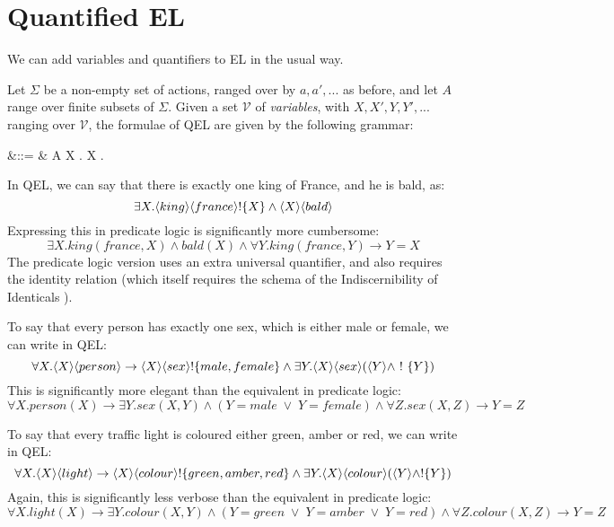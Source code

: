 \section{Quantified EL}

We can add variables and quantifiers to EL in the usual way.
\begin{definition} 
Let $\Sigma$ be a non-empty set of actions, ranged over by $a, a', ...$ as before, and let $A$ range over
finite subsets of $\Sigma$. 
Given a set $\mathcal{V}$ of \emph{variables},
with $X, X', Y, Y', ...$ ranging over $\mathcal{V}$, the formulae of QEL are given by the
following grammar:

\begin{GRAMMAR}
  \phi 
     &\quad ::= \quad & 
  \TRUE 
     \VERTICAL 
  \phi \AND \psi
     \VERTICAL 
     \VERTICAL 
     \VERTICAL 
  \fBang A 
     \VERTICAL 
  \exists X . {\phi}
     \VERTICAL 
  \forall X . {\phi}
\end{GRAMMAR}
\end{definition}
In QEL, we can say that there is exactly one king of France, and he is bald, as:
\[
\exists X . \langle king \rangle \langle france \rangle ! \{X\} \land \langle X \rangle \langle bald \rangle \]
Expressing this in predicate logic is significantly more cumbersome:
\[
\exists X. king(france, X) \land bald(X) \land \forall Y. king(france, Y) \rightarrow Y = X
\]
The predicate logic version uses an extra universal quantifier, and also requires the identity relation (which itself requires the schema of the Indiscernibility of Identicals ).

To say that every person has exactly one sex, which is either male or female, we can write in QEL:
\[
\forall X . \langle X \rangle \langle person \rangle \rightarrow \langle X \rangle \langle sex \rangle ! \{male, female\} \land \exists Y . \langle X \rangle \langle sex \rangle (\langle Y \rangle \land \ ! \  \{Y\})
\]
This is significantly more elegant than the equivalent in predicate logic:
\[
\forall X. person(X) \rightarrow \exists Y . sex(X,Y) \land (Y = male \; \lor \; Y = female) \land \forall Z . sex(X,Z) \rightarrow Y = Z
\]

To say that every traffic light is coloured either green, amber or red, we can write in QEL:
\[
\forall X. \langle X \rangle \langle light \rangle \rightarrow \langle X \rangle \langle colour \rangle !\{green, amber, red\} \land \exists Y . \langle X \rangle \langle colour \rangle (\langle Y \rangle \land !\{Y\})
\]
Again, this is significantly less verbose than the equivalent in predicate logic:
\[
\forall X. light(X) \rightarrow \exists Y . colour(X,Y) \land (Y = green \; \lor \; Y = amber \; \lor \; Y = red) \land \forall Z . colour(X,Z) \rightarrow Y = Z
\]
